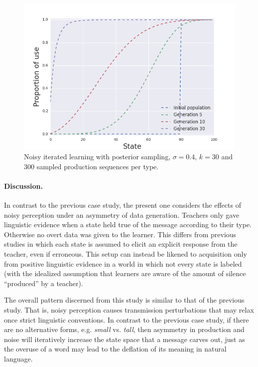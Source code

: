 \documentclass[10pt,a4paper]{article}
\begin{document}
\begin{figure}[ht]
\centering
    \includegraphics[scale=0.45]{../code/plots/deflation-sigma04.png}
  \caption{Noisy iterated learning with posterior sampling, $\sigma = 0.4$, $k = 30$ and $300$ sampled production sequences per type.}
  \label{fig:defl}
\end{figure}

\paragraph{Discussion.} In contrast to the previous case study, the present one considers the effects of noisy perception under an asymmetry of data generation. Teachers only gave linguistic evidence when a state held true of the message according to their type. Otherwise no overt data was given to the learner. This differs from previous studies in which each state is assumed to elicit an explicit response from the teacher, even if erroneous. This setup can instead be likened to acquisition only from positive linguistic evidence in a world in which not every state is labeled (with the idealized assumption that learners are aware of the amount of silence ``produced'' by a teacher). 

The overall pattern discerned from this study is similar to that of the previous study. That is, noisy perception causes transmission perturbations that may relax once strict linguistic conventions. In contrast to the previous case study, if there are no alternative forms, e.g. {\em small} vs. {\em tall}, then asymmetry in production and noise will iteratively increase the state space that a message carves out, just as the overuse of a word may lead to the deflation of its meaning in natural language.
\end{document}
